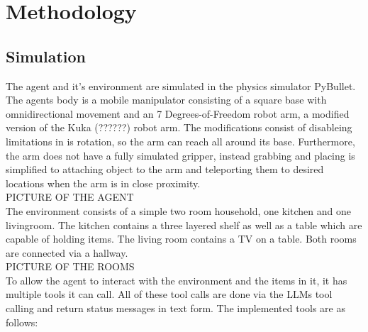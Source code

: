 \documentclass[../report.tex]{subfiles}
\begin{document}
\section{Methodology}
\label{sec:methodology}

\subsection{Simulation}
The agent and it's environment are simulated in the physics simulator PyBullet. The agents body is a mobile manipulator consisting of a square base with omnidirectional movement and an 7 Degrees-of-Freedom robot arm,
a modified version of the Kuka (??????) robot arm. The modifications consist of disableing limitations in is rotation, so the arm can reach all around its base. Furthermore, the arm does not have a fully simulated gripper,
instead grabbing and placing is simplified to attaching object to the arm and teleporting them to desired locations when the arm is in close proximity. \\
PICTURE OF THE AGENT \\
The environment consists of a simple two room household, one kitchen and one livingroom. The kitchen contains a three layered shelf as well as a table which are capable of holding items. The living room contains a TV on a table.
Both rooms are connected via a hallway. \\
PICTURE OF THE ROOMS \\
To allow the agent to interact with the environment and the items in it, it has multiple tools it can call. All of these tool calls are done via the LLMs tool calling and return status messages in text form.
The implemented tools are as follows: \\
\end{document}
